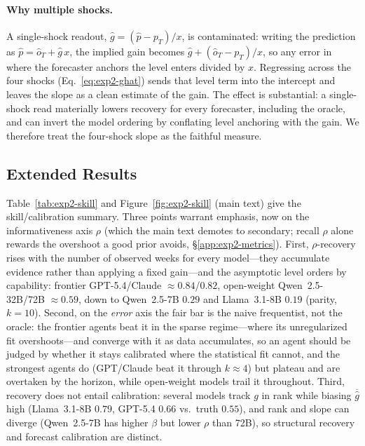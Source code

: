 \documentclass{article} %
\begin{document}
\paragraph{Why multiple shocks.}  A single-shock readout, $\hat g=(\hat p-p_T)/x$, is
contaminated: writing the prediction as $\hat p = \hat o_T + \hat g\,x$, the implied gain becomes
$\hat g + (\hat o_T - p_T)/x$, so any error in where the forecaster anchors the level enters
divided by $x$.  Regressing across the four shocks (Eq.~\eqref{eq:exp2-ghat}) sends that level term
into the intercept and leaves the slope as a clean estimate of the gain.  The effect is
substantial: a single-shock read materially lowers recovery for every forecaster, including the
oracle, and can invert the model ordering by conflating level anchoring with the gain.  We therefore
treat the four-shock slope as the faithful measure.

\subsection{Extended Results}
\label{app:exp2-extended}

Table~\ref{tab:exp2-skill} and Figure~\ref{fig:exp2-skill} (main text) give the skill/calibration
summary.  Three points warrant emphasis, now on the informativeness axis $\rho$ (which the main text
demotes to secondary; recall $\rho$ alone rewards the overshoot a good prior avoids,
\S\ref{app:exp2-metrics}).  First, $\rho$-recovery rises with the number of
observed weeks for every model---they accumulate evidence rather than applying a fixed gain---and the
asymptotic level orders by capability: frontier GPT-5.4/Claude $\approx0.84$/$0.82$, open-weight
Qwen~2.5-32B/72B $\approx0.59$, down to Qwen~2.5-7B $0.29$ and Llama~3.1-8B $0.19$ (parity, $k=10$).
Second, on the \emph{error} axis the fair bar is the naive frequentist, not the oracle: the
frontier agents beat it in the sparse regime---where its unregularized fit overshoots---and converge
with it as data accumulates, so an agent should be judged by whether it stays calibrated where the
statistical fit cannot, and the strongest agents do (GPT/Claude
beat it through $k\approx4$) but plateau and are overtaken by the horizon, while open-weight models
trail it throughout.  Third,
recovery does not entail calibration: several models track $g$ in rank while biasing $\overline{\hat
g}$ high (Llama~3.1-8B $0.79$, GPT-5.4 $0.66$ vs.\ truth $0.55$), and rank and slope can diverge
(Qwen~2.5-7B has higher $\beta$ but lower $\rho$ than 72B), so structural recovery and forecast
calibration are distinct.
\end{document}
